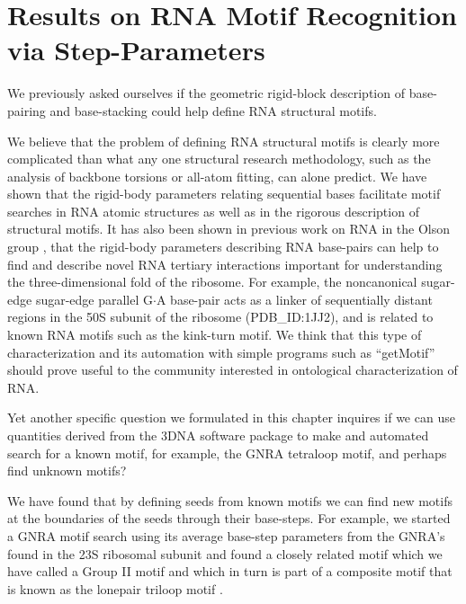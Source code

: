 
\section{Results on RNA Motif Recognition via Step-Parameters}

We previously asked ourselves if the geometric rigid-block description
of  base-pairing and  base-stacking could  help define  RNA structural
motifs.

We  believe that  the problem  of  defining RNA  structural motifs  is
clearly  more  complicated  than  what  any  one  structural  research
methodology,  such as the  analysis of  backbone torsions  or all-atom
fitting,  can  alone  predict.   We  have shown  that  the  rigid-body
parameters relating sequential bases  facilitate motif searches in RNA
atomic structures as well as in the rigorous description of structural
motifs. It  has also been shown in  previous work on RNA  in the Olson
group \cite{yurongthesis},  that the rigid-body  parameters describing
RNA  base-pairs can  help  to  find and  describe  novel RNA  tertiary
interactions important for understanding the three-dimensional fold of
the  ribosome.  For  example, the  noncanonical  sugar-edge sugar-edge
parallel G$\cdot$A base-pair acts  as a linker of sequentially distant
regions  in the  50S subunit  of the  ribosome (PDB\_ID:1JJ2),  and is
related to  known RNA  motifs such as  the kink-turn motif.   We think
that  this type  of characterization  and its  automation  with simple
programs  such as ``getMotif''  should prove  useful to  the community
interested in ontological characterization of RNA.

Yet another  specific question we formulated in  this chapter inquires
if we  can use  quantities derived from  the 3DNA software  package to
make and  automated search  for a known  motif, for example,  the GNRA
tetraloop motif, and perhaps find unknown motifs?

We have found that by defining seeds from known motifs we can find new
motifs at the  boundaries of the seeds through  their base-steps.  For
example, we  started a GNRA  motif search using its  average base-step
parameters  from the  GNRA's found  in the  23S ribosomal  subunit and
found a  closely related motif which  we have called a  Group II motif
and which  in turn  is part of  a composite  motif \cite{nasalean2009}
that is known as the lonepair triloop motif \cite{lee2003}.

